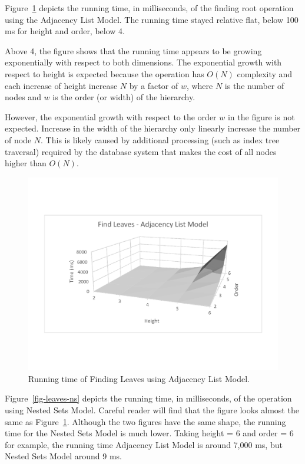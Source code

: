 Figure~\ref{fig-leaves-al} depicts the running time, in milliseconds, of the finding root operation using the Adjacency List Model. The running time stayed relative flat, below 100 ms for height and order, below 4.

Above 4, the figure shows that the running time appears to be growing exponentially with respect to both dimensions. The exponential growth with respect to height is expected because the operation has $O(N)$ complexity and each increase of height increase $N$ by a factor of $w$, where $N$ is the number of nodes and $w$ is the order (or width) of the hierarchy.

However, the exponential growth with respect to the order $w$ in the figure is not expected. Increase in the width of the hierarchy only linearly increase the number of node $N$. This is likely caused by additional processing (such as index tree traversal) required by the database system that makes the cost of all nodes higher than $O(N)$.

\begin{figure}[!h]
\begin{center}
\includegraphics[width=6in]{images/eval/leaves/al_surface.pdf}
\caption{Running time of Finding Leaves using Adjacency List Model.\label{fig-leaves-al}}
\end{center}
\end{figure}


Figure~\ref{fig-leaves-ns} depicts the running time, in milliseconds, of the operation using Nested Sets Model. Careful reader will find that the figure looks almost the same as Figure~\ref{fig-leaves-al}. Although the two figures have the same shape, the running time for the Nested Sets Model is much lower. Taking height = 6 and order = 6 for example, the running time Adjacency List Model is around 7,000 ms, but Nested Sets Model around  9 ms.

